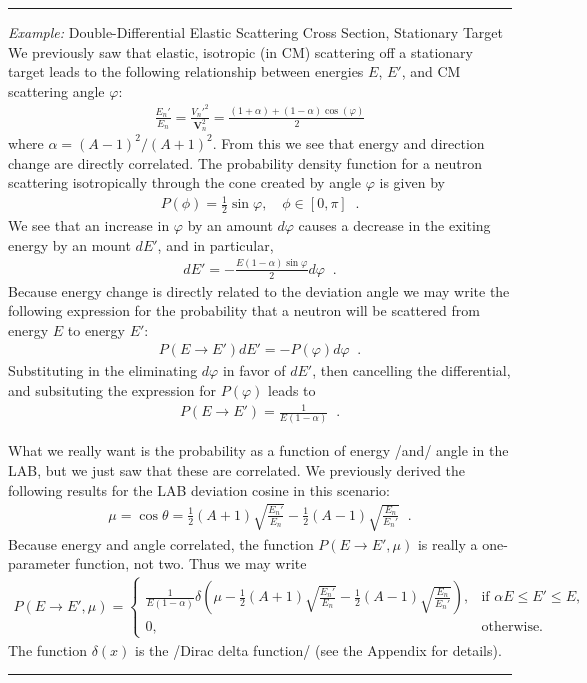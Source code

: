 \documentclass[11pt]{article}
\renewcommand\vec{\mathbf}
\newenvironment{example}[1]{\vspace{0.2in}\hrule\vspace{0.1in}\noindent\emph{Example:} #1 \\}{\vspace{0.1in}\hrule\vspace{0.2in}}
\begin{document}
\begin{example}{Double-Differential Elastic Scattering Cross Section, Stationary Target}
We previously saw that elastic, isotropic (in CM) scattering off a stationary target leads to the following relationship between energies $E$, $E'$, and CM scattering angle $\varphi$:
\begin{align}
  \frac{E_n'}{E_n} = \frac{V_n'^2}{\vec{V}_n^2}
                   = \frac{(1+\alpha) + (1-\alpha) \cos(\varphi)}{2}
\end{align}
where $\alpha = (A-1)^2/(A+1)^2$.  From this we see that energy and direction change are directly correlated.  The probability density function for a neutron scattering isotropically through the cone created by angle $\varphi$ is given by
\begin{align}
  P(\phi) = \frac{1}{2} \sin\varphi, \quad \phi\in[0,\pi] \;\;.
\end{align}
We see that an increase in $\varphi$ by an amount $d\varphi$ causes a decrease in the exiting energy by an mount $dE'$, and in particular,
\begin{align}
  dE' = - \frac{E(1-\alpha)\sin\varphi}{2}d\varphi \;\;.
\end{align}
Because energy change is directly related to the deviation angle we may write the following expression for the probability that a neutron will be scattered from energy $E$ to energy $E'$:
\begin{align}
  P(E \rightarrow E') dE' = - P(\varphi) d\varphi \;\;.
\end{align}
Substituting in the eliminating $d\varphi$ in favor of $dE'$, then cancelling the differential, and subsituting the expression for $P(\varphi)$ leads to
\begin{align}
  P(E \rightarrow E') = \frac{1}{E(1-\alpha)} \;\;.
\end{align}

What we really want is the probability as a function of energy /and/ angle in the LAB, but we just saw that these are correlated.  We previously derived the following results for the LAB deviation cosine in this scenario:
\begin{align}
  \mu = \cos\theta = \frac{1}{2}\left( A+1 \right) \sqrt{\frac{E_n'}{E_n}}
                   - \frac{1}{2}\left( A-1 \right) \sqrt{\frac{E_n}{E_n'}} \;\;.
\end{align}
Because energy and angle correlated, the function $P(E \rightarrow E', \mu)$ is really a one-parameter function, not two.  Thus we may write
\begin{align}
  P(E \rightarrow E', \mu) = 
  \begin{cases}
    \frac{1}{E(1-\alpha)}\delta\left( \mu - \frac{1}{2}\left( A+1 \right) \sqrt{\frac{E_n'}{E_n}}
                                     - \frac{1}{2}\left( A-1 \right) \sqrt{\frac{E_n}{E_n'}} \right), & \text{if } \alpha E \leq E' \leq E, \\
    0, & \text{otherwise.}
  \end{cases}
\end{align}
The function $\delta(x)$ is the /Dirac delta function/ (see the Appendix for details).
\end{example}
\end{document}
